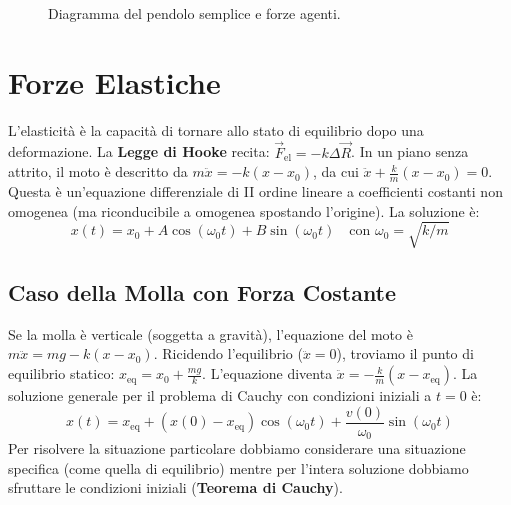 \begin{figure}[ht]
    \centering
    \caption{Diagramma del pendolo semplice e forze agenti.}
\end{figure}

\section{Forze Elastiche}
L'elasticità è la capacità di tornare allo stato di equilibrio dopo una deformazione. La \textbf{Legge di Hooke} recita: $\vec{F}_{\text{el}} = -k \Delta \vec{R}$.
In un piano senza attrito, il moto è descritto da $m \ddot{x} = -k(x - x_0)$, da cui $\ddot{x} + \frac{k}{m}(x - x_0) = 0$.
Questa è un'equazione differenziale di II ordine lineare a coefficienti costanti non omogenea (ma riconducibile a omogenea spostando l'origine). La soluzione è:
\begin{equation}
    x(t) = x_0 + A \cos(\omega_0 t) + B \sin(\omega_0 t) \quad \text{con } \omega_0 = \sqrt{k/m}
\end{equation}

\subsection{Caso della Molla con Forza Costante}
Se la molla è verticale (soggetta a gravità), l'equazione del moto è $m \ddot{x} = mg - k (x - x_0)$.
Ricidendo l'equilibrio ($\ddot{x}=0$), troviamo il punto di equilibrio statico:
$x_{\text{eq}} = x_0 + \frac{mg}{k}$.
L'equazione diventa $\ddot{x} = -\frac{k}{m} (x - x_{\text{eq}})$.
La soluzione generale per il problema di Cauchy con condizioni iniziali a $t=0$ è:
\begin{equation}
    x(t) = x_{\text{eq}} + (x(0) - x_{\text{eq}}) \cos(\omega_0 t) + \frac{v(0)}{\omega_0} \sin(\omega_0 t)
\end{equation}
Per risolvere la situazione particolare dobbiamo considerare una situazione specifica (come quella di equilibrio) mentre per l'intera soluzione dobbiamo sfruttare le condizioni iniziali (\textbf{Teorema di Cauchy}).

